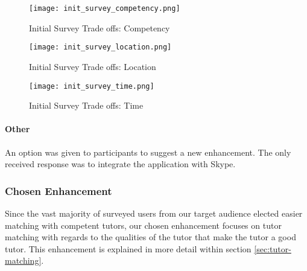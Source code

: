\begin{figure}[ht]
  \caption{Initial Survey Trade offs: Competency}
  \centering
    \label{fig:init_survey_competency}
    \texttt{[image: init\_survey\_competency.png]}
\end{figure}

\begin{figure}[ht]
  \caption{Initial Survey Trade offs: Location} 
  \centering
    \label{fig:init_survey_location}
    \texttt{[image: init\_survey\_location.png]}
\end{figure}

\begin{figure}[ht]
  \caption{Initial Survey Trade offs: Time} 
  \centering
    \label{fig:init_survey_time}
    \texttt{[image: init\_survey\_time.png]}
\end{figure}

\paragraph{Other} An option was given to participants to suggest a new
enhancement. The only received response was to integrate the
application with Skype.


\subsubsection{Chosen Enhancement}
Since the vast majority of surveyed users from our target audience 
elected easier matching with competent tutors, our chosen enhancement
focuses on tutor matching with regards to the qualities of the tutor that 
make the tutor a good tutor. This enhancement is explained in more detail within section \ref{sec:tutor-matching}.

